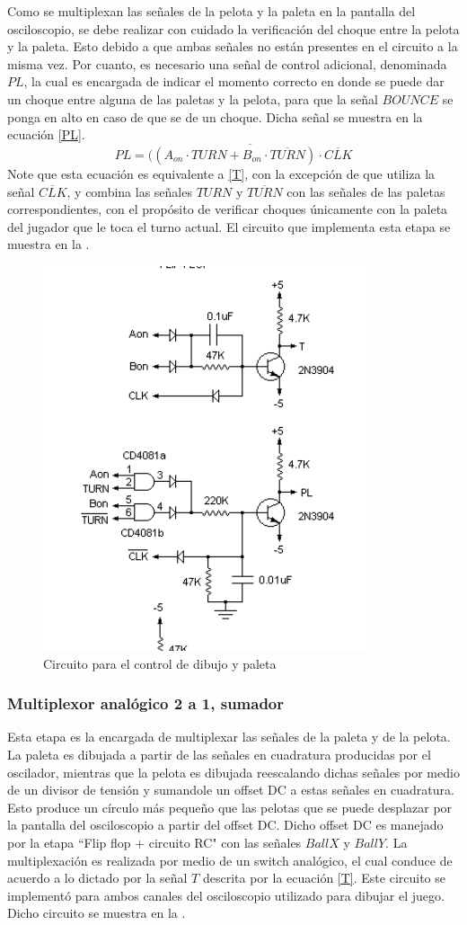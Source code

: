Como se multiplexan las señales de la pelota y la paleta en la pantalla del osciloscopio, se debe realizar con cuidado la verificación del choque entre la pelota y la paleta. Esto debido a que ambas señales no están presentes en el circuito a la misma vez.
Por cuanto, es necesario una señal de control adicional, denominada $PL$, la cual es encargada de indicar el momento correcto en donde se puede dar un choque entre alguna de las paletas y la pelota, para que la señal $BOUNCE$ se ponga en alto en caso de que se de un choque. 
Dicha señal se muestra en la ecuación \eqref{PL}.
\begin{equation}
    PL = \overline{((A_{on}\cdot TURN + B_{on} \cdot\overline{TURN})\cdot\overline{CLK}}\label{PL}
\end{equation}
Note que esta ecuación es equivalente a \eqref{T}, con la excepción de que utiliza la señal $\overline{CLK}$, y combina las señales $TURN$ y $\overline{TURN}$ con las señales de las paletas correspondientes, con el propósito de verificar choques únicamente con la paleta del jugador que le toca el turno actual. 
El circuito que implementa esta etapa se muestra en la .

\begin{figure}[H]
    \centering
    \includegraphics[width=0.5\linewidth]{figs/descripcion/ccu.png}
    \caption{Circuito para el control de dibujo y paleta \cite{pong}}
    \label{ccu}
\end{figure}

\subsubsection{Multiplexor analógico 2 a 1, sumador}
Esta etapa es la encargada de multiplexar las señales de la paleta y de la pelota. 
La paleta es dibujada a partir de las señales en cuadratura producidas por el oscilador, mientras que la pelota es dibujada reescalando dichas señales por medio de un divisor de tensión y sumandole un offset DC a estas señales en cuadratura.
Esto produce un círculo más pequeño que las pelotas que se puede desplazar por la pantalla del osciloscopio a partir del offset DC.
Dicho offset DC es manejado por la etapa ``Flip flop + circuito RC" con las señales $BallX$ y $BallY$.
La multiplexación es realizada por medio de un switch analógico, el cual conduce de acuerdo a lo dictado por la señal $T$ descrita por la ecuación \eqref{T}.
Este circuito se implementó para ambos canales del osciloscopio utilizado para dibujar el juego.
Dicho circuito se muestra en la .

